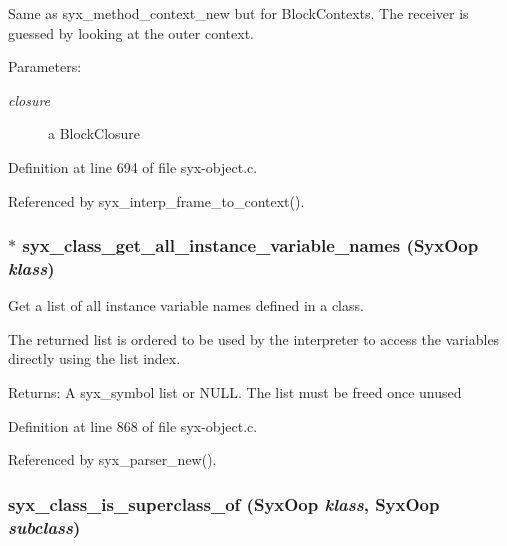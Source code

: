 Same as syx\_\-method\_\-context\_\-new but for BlockContexts. The receiver is guessed by looking at the outer context.

\begin{Desc}
\item[Parameters:]
\begin{description}
\item[{\em closure}]a BlockClosure \end{description}
\end{Desc}


Definition at line 694 of file syx-object.c.

Referenced by syx\_\-interp\_\-frame\_\-to\_\-context().\hypertarget{syx-object_8c_74f615d1e149a01f1e825aa33f3bf9c4}{
\subsubsection{$\ast$ syx\_\-class\_\-get\_\-all\_\-instance\_\-variable\_\-names ({\bf SyxOop} {\em klass})}}
\label{syx-object_8c_74f615d1e149a01f1e825aa33f3bf9c4}


Get a list of all instance variable names defined in a class.

The returned list is ordered to be used by the interpreter to access the variables directly using the list index.

\begin{Desc}
\item[Returns:]A syx\_\-symbol list or NULL. The list must be freed once unused \end{Desc}


Definition at line 868 of file syx-object.c.

Referenced by syx\_\-parser\_\-new().\hypertarget{syx-object_8c_973315a5004f9f3e788e8f7e6fd3a183}{
\subsubsection{ syx\_\-class\_\-is\_\-superclass\_\-of ({\bf SyxOop} {\em klass}, \/  {\bf SyxOop} {\em subclass})}}
\label{syx-object_8c_973315a5004f9f3e788e8f7e6fd3a183}


